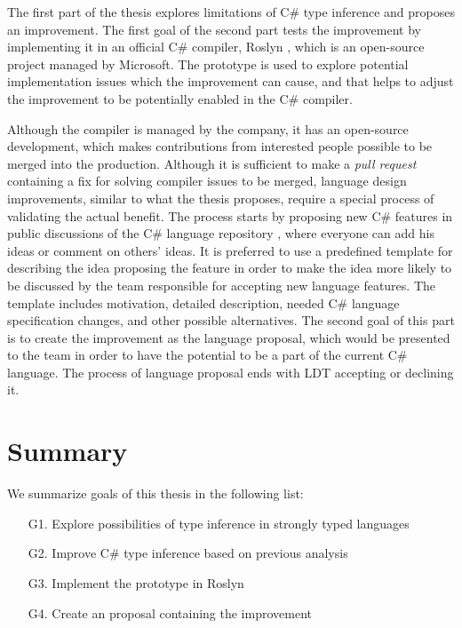 The first part of the thesis explores limitations of C\# type inference and proposes an improvement.
The first goal of the second part tests the improvement by implementing it in an official C\# compiler, Roslyn \cite{online:langRepo}, which is an open-source project managed by Microsoft.
The prototype is used to explore potential implementation issues which the improvement can cause, and that helps to adjust the improvement to be potentially enabled in the C\# compiler.
\par
Although the compiler is managed by the company, it has an open-source development, which makes contributions from interested people possible to be merged into the production.
Although it is sufficient to make a \textit{pull request} containing a fix for solving compiler issues to be merged, language design improvements, similar to what the thesis proposes, require a special process of validating the actual benefit.
The process starts by proposing new C\# features in public discussions of the C\# language repository \cite{online:langRepo}, where everyone can add his ideas or comment on others' ideas. 
It is preferred to use a predefined template \cite{online:proposalTemplate} for describing the idea proposing the feature in order to make the idea more likely to be discussed by the team responsible for accepting new language features. 
The template includes motivation, detailed description, needed C\# language specification \cite{online:langSpec} changes, and other possible alternatives.
The second goal of this part is to create the improvement as the language proposal, which would be presented to the team in order to have the potential to be a part of the current C\# language.
The process of language proposal ends with \ac{LDT} accepting or declining it. 

\section{Summary}

We summarize goals of this thesis in the following list:

\begin{enumerate}
  \item[G1.] Explore possibilities of type inference in strongly typed languages
  \item[G2.] Improve C\# type inference based on previous analysis
  \item[G3.] Implement the prototype in Roslyn
  \item[G4.] Create an proposal containing the improvement
\end{enumerate}